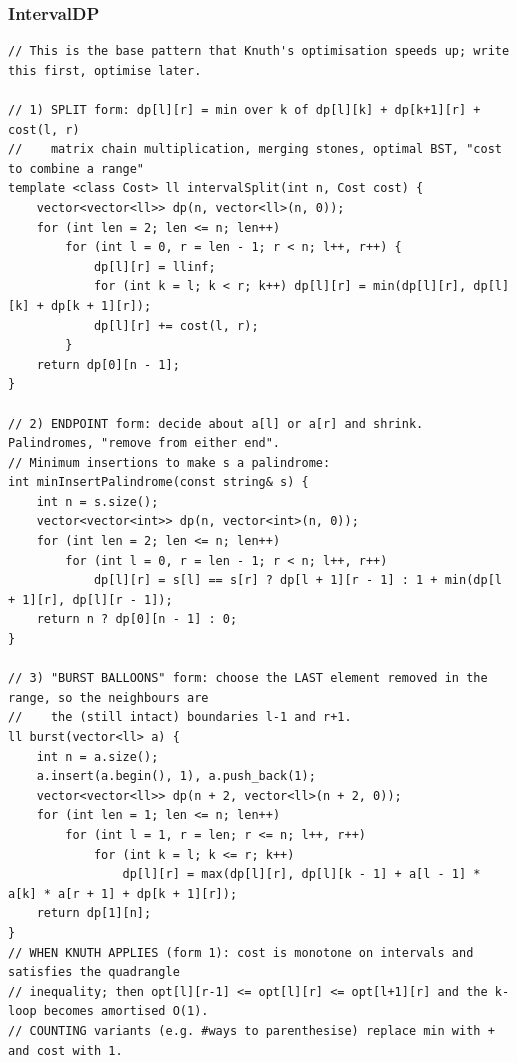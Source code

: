\documentclass[9pt,a4paper,twocolumn]{extarticle}
\begin{document}
\subsubsection{IntervalDP}
\nopagebreak
\begin{lstlisting}
// This is the base pattern that Knuth's optimisation speeds up; write this first, optimise later.

// 1) SPLIT form: dp[l][r] = min over k of dp[l][k] + dp[k+1][r] + cost(l, r)
//    matrix chain multiplication, merging stones, optimal BST, "cost to combine a range"
template <class Cost> ll intervalSplit(int n, Cost cost) {
    vector<vector<ll>> dp(n, vector<ll>(n, 0));
    for (int len = 2; len <= n; len++)
        for (int l = 0, r = len - 1; r < n; l++, r++) {
            dp[l][r] = llinf;
            for (int k = l; k < r; k++) dp[l][r] = min(dp[l][r], dp[l][k] + dp[k + 1][r]);
            dp[l][r] += cost(l, r);
        }
    return dp[0][n - 1];
}

// 2) ENDPOINT form: decide about a[l] or a[r] and shrink. Palindromes, "remove from either end".
// Minimum insertions to make s a palindrome:
int minInsertPalindrome(const string& s) {
    int n = s.size();
    vector<vector<int>> dp(n, vector<int>(n, 0));
    for (int len = 2; len <= n; len++)
        for (int l = 0, r = len - 1; r < n; l++, r++)
            dp[l][r] = s[l] == s[r] ? dp[l + 1][r - 1] : 1 + min(dp[l + 1][r], dp[l][r - 1]);
    return n ? dp[0][n - 1] : 0;
}

// 3) "BURST BALLOONS" form: choose the LAST element removed in the range, so the neighbours are
//    the (still intact) boundaries l-1 and r+1.
ll burst(vector<ll> a) {
    int n = a.size();
    a.insert(a.begin(), 1), a.push_back(1);
    vector<vector<ll>> dp(n + 2, vector<ll>(n + 2, 0));
    for (int len = 1; len <= n; len++)
        for (int l = 1, r = len; r <= n; l++, r++)
            for (int k = l; k <= r; k++)
                dp[l][r] = max(dp[l][r], dp[l][k - 1] + a[l - 1] * a[k] * a[r + 1] + dp[k + 1][r]);
    return dp[1][n];
}
// WHEN KNUTH APPLIES (form 1): cost is monotone on intervals and satisfies the quadrangle
// inequality; then opt[l][r-1] <= opt[l][r] <= opt[l+1][r] and the k-loop becomes amortised O(1).
// COUNTING variants (e.g. #ways to parenthesise) replace min with + and cost with 1.
\end{lstlisting}
\end{document}
